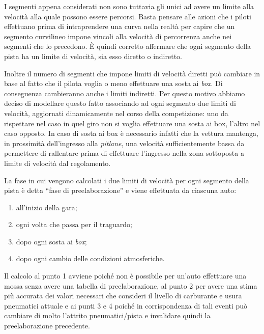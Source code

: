 \documentclass[a4paper]{report}
\begin{document}
I segmenti appena considerati non sono tuttavia gli unici ad avere un limite alla velocità alla quale possono essere percorsi. Basta pensare alle azioni che i piloti effettuano prima di intraprendere una curva nella realtà per capire che un segmento curvilineo impone vincoli alla velocità di percorrenza anche nei segmenti che lo precedono. \`E quindi corretto affermare che ogni segmento della pista ha un limite di velocità, sia esso diretto o indiretto.

Inoltre il numero di segmenti che impone limiti di velocità diretti può cambiare in base al fatto che il pilota voglia o meno effettuare una sosta ai \textit{box}. Di conseguenza cambieranno anche i limiti indiretti. Per questo motivo abbiamo deciso di modellare questo fatto associando ad ogni segmento due limiti di velocità, aggiornati dinamicamente nel corso della competizione: uno da rispettare nel caso in quel giro non si voglia effettuare una sosta ai box, l'altro nel caso opposto. In caso di sosta ai box è necessario infatti che la vettura mantenga, in prossimità dell'ingresso alla \textit{pitlane}, una velocità sufficientemente bassa da permettere di rallentare prima di effettuare l'ingresso nella zona sottoposta a limite di velocità dal regolamento.

La fase in cui vengono calcolati i due limiti di velocità per ogni segmento della pista è detta ``fase di preelaborazione'' e viene effettuata da ciascuna auto:
\begin{enumerate}
\item all'inizio della gara;
\item ogni volta che passa per il traguardo;
\item dopo ogni sosta ai \textit{box};
\item dopo ogni cambio delle condizioni atmosferiche.
\end{enumerate}
Il calcolo al punto 1 avviene poiché non è possibile per un'auto effettuare una mossa senza avere una tabella di preelaborazione, al punto 2 per avere una stima più accurata dei valori necessari che consideri il livello di carburante e usura pneumatici attuale e ai punti 3 e 4 poiché in corrispondenza di tali eventi può cambiare di molto l'attrito pneumatici/pista e invalidare quindi la preelaborazione precedente.
\end{document}
